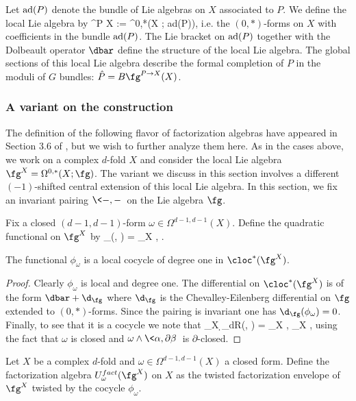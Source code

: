 Let ${\rm ad}(P)$ denote the bundle of Lie algebras on $X$ associated to $P$. We define the local Lie algebra by
\ben
\fg^{P \to X} := \Omega^{0,*}(X ; {\rm ad}(P)),
\een 
i.e. the $(0,*)$-forms on $X$ with coefficients in the bundle ${\rm ad}(P)$. The Lie bracket on ${\rm ad}(P)$ together with the Dolbeault operator $\dbar$ define the structure of the local Lie algebra. The global sections of this local Lie algebra describe the formal completion of $P$ in the moduli of $G$ bundles: $\Hat{P} = B \fg^{P \to X}(X)$. 

\subsubsection{A variant on the construction}

The definition of the following flavor of factorization algebras have appeared in Section 3.6 of \cite{book1}, but we wish to further analyze them here. As in the cases above, we work on a complex $d$-fold $X$ and consider the local Lie algebra $\fg^X = \Omega^{0,*}(X; \fg)$. The variant we discuss in this section involves a different $(-1)$-shifted central extension of this local Lie algebra. In this section, we fix an invariant pairing $\<-,-\>$ on the Lie algebra $\fg$. 

Fix a closed $(d-1,d-1)$-form $\omega \in \Omega^{d-1,d-1}(X)$. Define the quadratic functional on $\fg^X$ by
\ben
\phi_\omega (\alpha , \beta) = \int_X \omega \wedge \<\alpha, \partial \beta\> .
\een

\begin{lem} The functional $\phi_\omega$ is a local cocycle of degree one in $\cloc^*(\fg^X)$. 
\end{lem}
\begin{proof} Clearly $\phi_\omega$ is local and degree one. The differential on $\cloc^*(\fg^X)$ is of the form $\dbar + \d_{\fg}$ where $\d_\fg$ is the Chevalley-Eilenberg differential on $\fg$ extended to $(0,*)$-forms. Since the pairing is invariant one has $\d_\fg(\phi_\omega) = 0$. Finally, to see that it is a cocycle we note that
\ben
\int_X \d_{dR}(\omega \wedge \<\alpha, \partial \beta\>) = \int_X \omega \wedge \<\dbar \alpha, \partial \beta\> \pm \int_X \omega \wedge \<\alpha, \dbar \partial \beta\>
\een
using the fact that $\omega$ is closed and $\omega \wedge \<\alpha, \partial \beta\>$ is $\partial$-closed. 
\end{proof}

\begin{dfn} Let $X$ be a complex $d$-fold and $\omega \in \Omega^{d-1,d-1}(X)$ a closed form. Define the factorization algebra $U^{fact}_{\omega}(\fg^X)$ on $X$ as the twisted factorization envelope of $\fg^X$ twisted by the cocycle $\phi_\omega$. 
\end{dfn}

